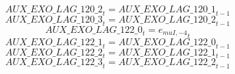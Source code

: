 \begin{dmath}
{AUX\_EXO\_LAG\_120\_2}_{t}={AUX\_EXO\_LAG\_120\_1}_{t-1}
\end{dmath}
\begin{dmath}
{AUX\_EXO\_LAG\_120\_3}_{t}={AUX\_EXO\_LAG\_120\_2}_{t-1}
\end{dmath}
\begin{dmath}
{AUX\_EXO\_LAG\_122\_0}_{t}={{e_{muI,-4}}}_{t}
\end{dmath}
\begin{dmath}
{AUX\_EXO\_LAG\_122\_1}_{t}={AUX\_EXO\_LAG\_122\_0}_{t-1}
\end{dmath}
\begin{dmath}
{AUX\_EXO\_LAG\_122\_2}_{t}={AUX\_EXO\_LAG\_122\_1}_{t-1}
\end{dmath}
\begin{dmath}
{AUX\_EXO\_LAG\_122\_3}_{t}={AUX\_EXO\_LAG\_122\_2}_{t-1}
\end{dmath}
